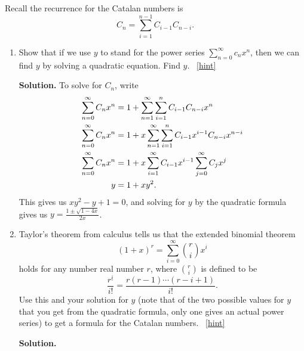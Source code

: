 \documentclass{book}
\begin{document}
\setcounter{project}{271}
\addtocounter{project}{-1}
\begin{activity}[]\label{CatalanRecurrence}
\hypertarget{p-1450}{}%
Recall the recurrence for the Catalan numbers is%
\begin{equation*}
C_n = \sum_{i=1}^{n-1} C_{i-1}C_{n-i}\text{.}
\end{equation*}
%
\begin{enumerate}[font=\bfseries,label=(\alph*),ref=\alph*]
\item\label{task-255} \hypertarget{p-1451}{}%
Show that if we use \(y\) to stand for the power series \(\sum_{n=0}^\infty c_nx^n\), then we can find \(y\) by solving a quadratic equation. Find \(y\).%
~\hfill{\tiny\hyperlink{a-271.a}{[hint]}\hypertarget{q-271.a}{}}\par\smallskip%
\noindent\textbf{Solution.}\hypertarget{solution-212}{}\quad%
\hypertarget{p-1453}{}%
To solve for \(C_n\), write%
\begin{align*}
\sum_{n=0}^\infty C_nx^n &= 1+\sum_{n=1}^\infty\sum_{i=1}^nC_{i-1}C_{n-i}x^n\\
\sum_{n=0}^\infty C_nx^n
&= 1+x\sum_{n=1}^\infty\sum_{i=1}^nC_{i-1}x^{i-1}C_{n-i}x^{n-i}\\
\sum_{n=0}^\infty C_nx^n
&= 1+x\sum_{i=1}^\infty C_{i-1}x^{i-1}\sum_{j=0}^\infty C_{j}x^{j}\\
y &= 1 + xy^2\text{.}
\end{align*}
This gives us \(xy^2-y+1=0\), and solving for \(y\) by the quadratic formula gives us \(y=\frac{1\pm \sqrt{1-4x}}{2x}\).%
\item\label{task-256} \hypertarget{p-1454}{}%
Taylor's theorem from calculus tells us that the extended binomial theorem%
\begin{equation*}
(1+x)^r = \sum_{i=0}^\infty \binom{r}{i}x^i
\end{equation*}
holds for any number real number \(r\), where \(\binom{r}{i}\) is defined to be%
\begin{equation*}
\frac{r^{\underline{i}}}{i!} = \frac{r(r-1)\cdots(r-i+1)}{i!}\text{.}
\end{equation*}
Use this and your solution for \(y\) (note that of the two possible values for \(y\) that you get from the quadratic formula, only one gives an actual power series) to get a formula for the Catalan numbers.%
~\hfill{\tiny\hyperlink{a-271.b}{[hint]}\hypertarget{q-271.b}{}}\par\smallskip%
\noindent\textbf{Solution.}\hypertarget{solution-213}{}\quad%

\end{enumerate}
\end{activity}
\end{document}

